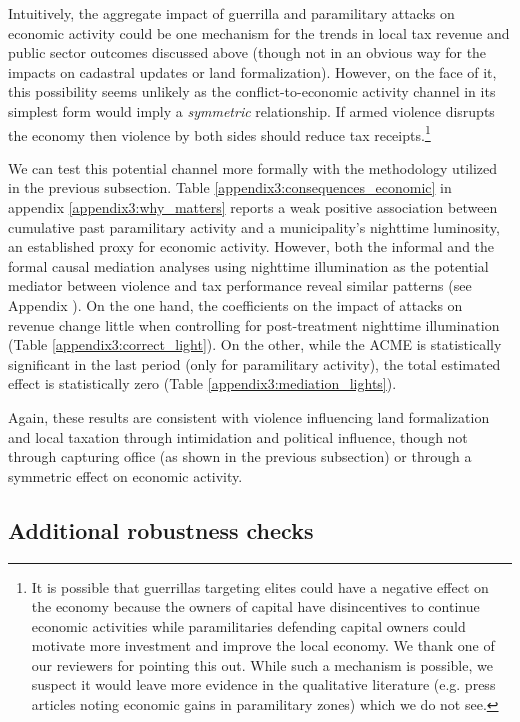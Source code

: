 Intuitively, the aggregate impact of guerrilla and paramilitary attacks on economic activity could be one mechanism for the trends in local tax revenue and public sector outcomes discussed above (though not in an obvious way for the impacts on cadastral updates or land formalization). However, on the face of it, this possibility seems unlikely as the conflict-to-economic activity channel in its simplest form would imply a {\it symmetric} relationship. If armed violence disrupts the economy then violence by both sides should reduce tax receipts.\footnote{It is possible that guerrillas targeting elites could have a negative effect on the economy because the owners of capital have disincentives to continue economic activities while paramilitaries defending capital owners could motivate more investment and improve the local economy. We thank one of our reviewers for pointing this out. While such a mechanism is possible, we suspect it would leave more evidence in the qualitative literature (e.g. press articles noting economic gains in paramilitary zones) which we do not see.} 

We can test this potential channel more formally with the methodology utilized in the previous subsection. Table \ref{appendix3:consequences_economic} in appendix \ref{appendix3:why_matters} reports a weak positive association between cumulative past paramilitary activity and a municipality's nighttime luminosity, an established proxy for economic activity. However, both the informal and the formal causal mediation analyses using nighttime illumination as the potential mediator between violence and tax performance reveal similar patterns (see Appendix \label{appendix3:test_electoral_mechanism}). On the one hand, the coefficients on the impact of attacks on revenue change little when controlling for post-treatment nighttime illumination (Table \ref{appendix3:correct_light}). On the other, while the ACME is statistically significant in the last period (only for paramilitary activity), the total estimated effect is statistically zero (Table \ref{appendix3:mediation_lights}). 

Again, these results are consistent with violence influencing land formalization and local taxation through intimidation and political influence, though not through capturing office (as shown in the previous subsection) or through a symmetric effect on economic activity.

\subsection{Additional robustness checks}

